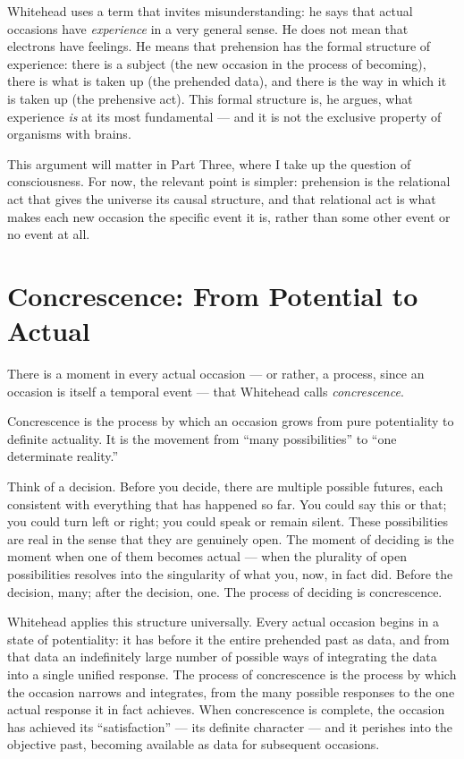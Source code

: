 Whitehead uses a term that invites misunderstanding: he says that actual
occasions have \emph{experience} in a very general sense.
He does not mean that electrons have feelings.
He means that prehension has the formal structure of experience: there is
a subject (the new occasion in the process of becoming), there is what is
taken up (the prehended data), and there is the way in which it is taken up
(the prehensive act).
This formal structure is, he argues, what experience \emph{is} at its
most fundamental --- and it is not the exclusive property of organisms with
brains.

This argument will matter in Part Three, where I take up the question of
consciousness.
For now, the relevant point is simpler: prehension is the relational act
that gives the universe its causal structure, and that relational act is
what makes each new occasion the specific event it is, rather than some
other event or no event at all.

\section{Concrescence: From Potential to Actual}
\label{sec:ch4-concrescence}

There is a moment in every actual occasion --- or rather, a process, since
an occasion is itself a temporal event --- that Whitehead calls
\emph{concrescence}.

Concrescence is the process by which an occasion grows from pure potentiality
to definite actuality.
It is the movement from ``many possibilities'' to ``one determinate reality.''

Think of a decision.
Before you decide, there are multiple possible futures, each consistent
with everything that has happened so far.
You could say this or that; you could turn left or right; you could speak
or remain silent.
These possibilities are real in the sense that they are genuinely open.
The moment of deciding is the moment when one of them becomes actual ---
when the plurality of open possibilities resolves into the singularity of
what you, now, in fact did.
Before the decision, many; after the decision, one.
The process of deciding is concrescence.

Whitehead applies this structure universally.
Every actual occasion begins in a state of potentiality: it has before it the
entire prehended past as data, and from that data an indefinitely large number
of possible ways of integrating the data into a single unified response.
The process of concrescence is the process by which the occasion narrows
and integrates, from the many possible responses to the one actual response
it in fact achieves.
When concrescence is complete, the occasion has achieved its ``satisfaction''
--- its definite character --- and it perishes into the objective past,
becoming available as data for subsequent occasions.

